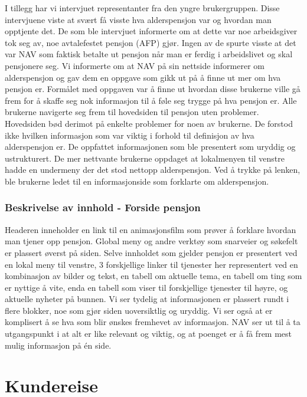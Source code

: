 \documentclass[informationsecurity]{gucmasterproject}
\begin{document}
I tillegg har vi intervjuet representanter fra den yngre brukergruppen. Disse intervjuene viste at svært få visste hva alderspensjon var og hvordan man opptjente det. De som ble intervjuet informerte om at dette var noe arbeidsgiver tok seg av, noe avtalefestet pensjon (AFP) gjør. Ingen av de spurte visste at det var NAV som faktisk betalte ut pensjon når man er ferdig i arbeidslivet og skal pensjonere seg. Vi informerte om at NAV på sin nettside informerer om alderspensjon og gav dem en oppgave som gikk ut på å finne ut mer om hva pensjon er. Formålet med oppgaven var å finne ut hvordan disse brukerne ville gå frem for å skaffe seg nok informasjon til å føle seg trygge på hva pensjon er.
Alle brukerne navigerte seg frem til hovedsiden til pensjon uten problemer. Hovedsiden bød derimot på enkelte problemer for noen av brukerne. De forstod ikke hvilken informasjon som var viktig i forhold til definisjon av hva alderspensjon er. De oppfattet informasjonen som ble presentert som uryddig og ustrukturert. De mer nettvante brukerne oppdaget at lokalmenyen til venstre hadde en undermeny der det stod nettopp alderspensjon. Ved å trykke på lenken, ble brukerne ledet til en informasjonside som forklarte om alderspensjon.

\subsubsection{Beskrivelse av innhold - Forside pensjon}
Headeren inneholder en link til en animasjonsfilm som prøver å forklare hvordan man tjener opp pensjon. Global meny og andre verktøy som snarveier og søkefelt er plassert øverst på siden. Selve innholdet som gjelder pensjon er presentert ved en lokal meny til venstre, 3 forskjellige linker til tjenester her representert ved en kombinasjon av bilder og tekst, en tabell om aktuelle tema, en tabell om ting som er nyttige å vite, enda en tabell som viser til forskjellige tjenester til høyre, og aktuelle nyheter på bunnen.
Vi ser tydelig at informasjonen er plassert rundt i flere blokker, noe som gjør siden uoversiktlig og uryddig. Vi ser også at er komplisert å se hva som blir ønskes fremhevet av informasjon. NAV ser ut til å ta utgangspunkt i at alt er like relevant og viktig, og at poenget er å få frem mest mulig informasjon på én side.



\section{Kundereise}
\end{document}
